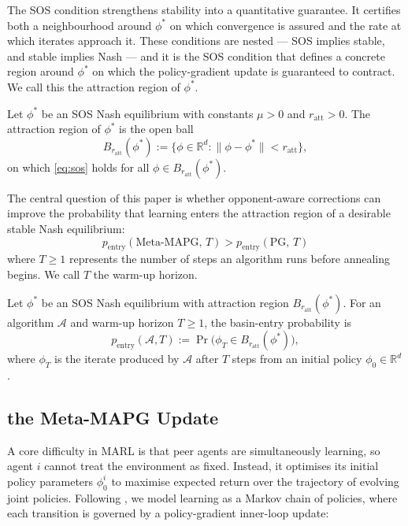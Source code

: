 \documentclass{nextgame2026} %
\begin{document}
The SOS condition strengthens stability into a quantitative guarantee. It certifies both a neighbourhood around $\phi^*$ on which convergence 
is assured and the rate at which iterates approach it. These conditions 
are nested --- SOS implies stable, and stable implies Nash --- and it is 
the SOS condition that defines a concrete region around $\phi^*$ on which 
the policy-gradient update is guaranteed to contract. We call this the 
attraction region of $\phi^*$.

\begin{definition}
\label{def:attraction-region}
Let $\phi^*$ be an SOS Nash equilibrium with constants $\mu > 0$ and 
$r_{\mathrm{att}} > 0$. The attraction region of $\phi^*$ is 
the open ball
\begin{equation}
    B_{r_{\mathrm{att}}}(\phi^*) := \bigl\{\phi \in \mathbb{R}^d : 
    \|\phi - \phi^*\| < r_{\mathrm{att}}\bigr\},
\end{equation}
on which \eqref{eq:sos} holds for all $\phi \in B_{r_{\mathrm{att}}}(\phi^*)$.
\end{definition}

The central question of this paper is whether opponent-aware corrections 
can improve the probability that learning enters the attraction region of 
a desirable stable Nash equilibrium:
\[
  p_{\mathrm{entry}}(\mathrm{Meta\text{-}MAPG},\, T)
  > p_{\mathrm{entry}}(\mathrm{PG},\, T)
\]
where  $T \geq 1$ represents the number of steps an algorithm runs before 
annealing begins. We call $T$ the warm-up horizon. 

\begin{definition}
Let $\phi^*$ be an SOS Nash equilibrium with attraction region
$B_{r_{\mathrm{att}}}(\phi^*)$. For an algorithm $\mathcal{A}$ and
warm-up horizon $T \geq 1$, the basin-entry probability is
\begin{equation}
   p_{\mathrm{entry}}(\mathcal{A}, T)
  := \Pr\!\bigl(\phi_T \in B_{r_{\mathrm{att}}}(\phi^*)\bigr),
\end{equation}
where $\phi_T$ is the iterate produced by $\mathcal{A}$ after $T$ steps
from an initial policy $\phi_0 \in \mathbb{R}^d$.
\end{definition}
\subsection{the Meta-MAPG Update}

A core difficulty in MARL is that peer agents are simultaneously learning, so agent $i$ cannot treat the environment as fixed. Instead, it optimises its initial policy parameters $\phi^i_0$ to maximise expected return over the trajectory of evolving joint policies. Following \citet{kim2021meta}, we model learning as a Markov chain of policies, where each transition is governed by a policy-gradient inner-loop update:
\end{document}
